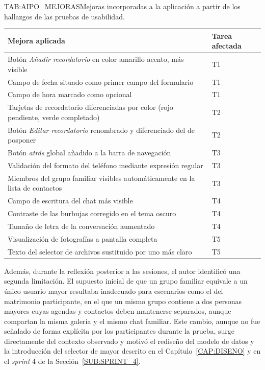 \begin{table}[Mejoras incorporadas]{TAB:AIPO_MEJORAS}{Mejoras incorporadas
a la aplicación a partir de los hallazgos de las pruebas de
usabilidad.}
\begin{center}
\begin{tabular}{p{6.5cm}l}
\toprule
\textbf{Mejora aplicada} & \textbf{Tarea afectada} \\
\midrule
Botón \emph{Añadir recordatorio} en color amarillo
acento, más visible                                     & T1 \\
Campo de fecha situado como primer campo del
formulario                                              & T1 \\
Campo de hora marcado como opcional                     & T1 \\
Tarjetas de recordatorio diferenciadas por color
(rojo pendiente, verde completado)                      & T2 \\
Botón \emph{Editar recordatorio} renombrado y
diferenciado del de posponer                            & T2 \\
Botón \emph{atrás} global añadido a la barra de
navegación                                              & T3 \\
Validación del formato del teléfono mediante
expresión regular                                       & T3 \\
Miembros del grupo familiar visibles automáticamente
en la lista de contactos                                & T3 \\
Campo de escritura del chat más visible                 & T4 \\
Contraste de las burbujas corregido en el tema oscuro   & T4 \\
Tamaño de letra de la conversación aumentado            & T4 \\
Visualización de fotografías a pantalla completa        & T5 \\
Texto del selector de archivos sustituido por uno
más claro                                               & T5 \\
\bottomrule
\end{tabular}
\end{center}
\end{table}
\FloatBarrier

Además, durante la reflexión posterior a las sesiones, el autor identificó
una segunda limitación. El supuesto inicial de que un grupo familiar
equivale a un único usuario mayor resultaba inadecuado para escenarios como
el del matrimonio participante, en el que un mismo grupo contiene a dos
personas mayores cuyas agendas y contactos deben mantenerse separados,
aunque compartan la misma galería y el mismo chat familiar. Este cambio,
aunque no fue señalado de forma explícita por los participantes durante la
prueba, surge directamente del contexto observado y motivó el rediseño del
modelo de datos y la introducción del selector de mayor descrito en el
Capítulo~\ref{CAP:DISENO} y en el \emph{sprint} 4 de la
Sección~\ref{SUB:SPRINT_4}.

